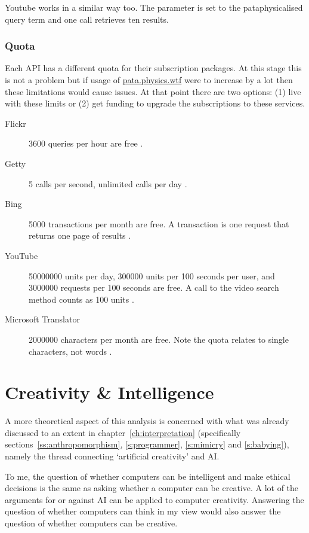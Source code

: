 Youtube works in a similar way too. The  parameter is set to the pataphysicalised query term and one call retrieves ten results.


\subsubsection{Quota}
\label{s:quota}

Each \ac{API} has a different quota for their subscription packages. At this stage this is not a problem but if usage of \url{pata.physics.wtf} were to increase by a lot then these limitations would cause issues. At that point there are two options: (1) live with these limits or (2) get funding to upgrade the subscriptions to these services.

\begin{description}
  \item[Flickr] \num{3600} queries per hour are free \autocite{FlickrGuideAPI}.
  \item[Getty] \num{5} calls per second, unlimited calls per day \autocite{GettyOverviewAPI}.
  \item[Bing] \num{5000} transactions per month are free. A transaction is one request that returns one page of results \autocite{BingAzureAPI}.
  \item[YouTube] \num{50000000} units per day, \num{300000} units per \num{100} seconds per user, and \num{3000000} requests per \num{100} seconds are free. A call to the video search method counts as \num{100} units \autocite{YouTubeAPI}.
  \item[Microsoft Translator] \num{2000000} characters per month are free. Note the quota relates to single characters, not words \autocite{TranslatorAPI}.
\end{description}


\section{Creativity \& Intelligence}
\label{s:theoryanalysis}

A more theoretical aspect of this analysis is concerned with what was already discussed to an extent in chapter~\ref{ch:interpretation} (specifically sections~\ref{ss:anthropomorphism}, \ref{s:programmer}, \ref{s:mimicry} and \ref{s:babying}), namely the thread connecting `artificial creativity' and \acf{AI}.

To me, the question of whether computers can be intelligent and make ethical decisions is the same as asking whether a computer can be creative. A lot of the arguments for or against \ac{AI} can be applied to computer creativity.   Answering the question of whether computers can think in my view would also answer the question of whether computers can be creative.
 
